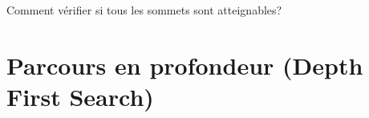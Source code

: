 \documentclass[svgnames,11pt]{beamer}
\begin{document}
\begin{frame}
\begin{center}
\begin{tikzpicture}
        \end{tikzpicture}
    \end{center}

\end{frame}
\begin{frame}
    \frametitle{}

    \begin{framed}
        \centering Comment vérifier si tous les sommets sont atteignables?
    \end{framed}

\end{frame}
\section{Parcours en profondeur (Depth First Search)}
\end{document}
